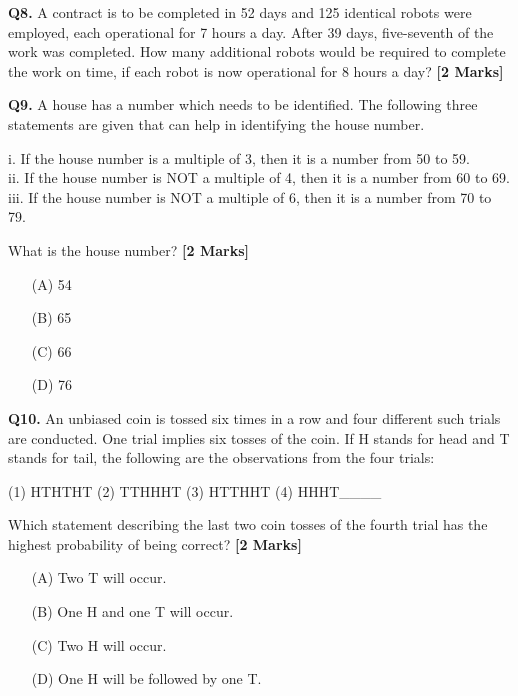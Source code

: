 \documentclass[11pt]{article}
\newcommand{\questionb}[2]{
    \noindent\textbf{Q#2.} #1 \hfill \textbf{[2 Marks]}
}
\begin{document}
\questionb{A contract is to be completed in 52 days and 125 identical robots were employed, each operational for 7 hours a day. After 39 days, five-seventh of the work was completed. How many additional robots would be required to complete the work on time, if each robot is now operational for 8 hours a day?}{8}
\vspace{0.5cm}

\questionb{A house has a number which needs to be identified. The following three statements are given that can help in identifying the house number.

i. If the house number is a multiple of 3, then it is a number from 50 to 59. \\
ii. If the house number is NOT a multiple of 4, then it is a number from 60 to 69. \\
iii. If the house number is NOT a multiple of 6, then it is a number from 70 to 79.

What is the house number?}{9}
\begin{enumerate}
    \item[(A)] 54
    \item[(B)] 65
    \item[(C)] 66
    \item[(D)] 76
\end{enumerate}
\vspace{0.5cm}

\questionb{An unbiased coin is tossed six times in a row and four different such trials are conducted. One trial implies six tosses of the coin. If H stands for head and T stands for tail, the following are the observations from the four trials: 

(1) HTHTHT \hspace{1cm} (2) TTHHHT \hspace{1cm} (3) HTTHHT \hspace{1cm} (4) HHHT\_\_\_\_

Which statement describing the last two coin tosses of the fourth trial has the highest probability of being correct?}{10}
\begin{enumerate}
    \item[(A)] Two T will occur.
    \item[(B)] One H and one T will occur.
    \item[(C)] Two H will occur.
    \item[(D)] One H will be followed by one T.
\end{enumerate}
\vspace{0.5cm}
\end{document}
